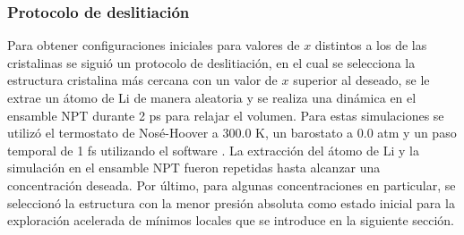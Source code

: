 \subsubsection{Protocolo de deslitiación}

Para obtener configuraciones iniciales para valores de $x$ distintos a los de las 
cristalinas se siguió un protocolo de deslitiación, en el cual se selecciona la 
estructura cristalina más cercana con un valor de $x$ superior al deseado,
se le extrae un átomo de Li de manera aleatoria y se realiza una dinámica en el 
ensamble NPT durante 2 ps para relajar el volumen. Para estas simulaciones se 
utilizó el termostato de Nosé-Hoover \cite{nose1984a, nose1984b, hoover1985} a
300.0 K, un barostato a 0.0 atm y un paso temporal de 1 fs utilizando el
software  \cite{lammps1, lammps2}. La extracción del átomo de Li y
la simulación en el ensamble NPT fueron repetidas hasta alcanzar una concentración
deseada. Por último, para algunas concentraciones en particular, se seleccionó la
estructura con la menor presión absoluta como estado inicial para la exploración 
acelerada de mínimos locales que se introduce en la siguiente sección.
